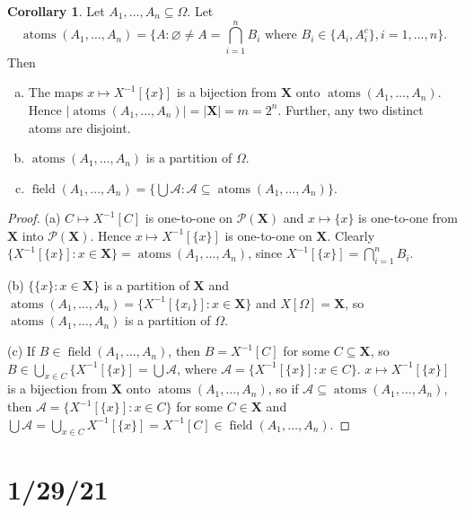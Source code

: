 \documentclass{article}
\DeclareMathOperator{\atoms}{atoms}
\theoremstyle{definition}
\newtheorem{corollary}[theorem]{Corollary}
\begin{document}
\begin{corollary}
    Let $A_1, \ldots, A_n \subseteq \Omega$. Let
    \[
        \atoms(A_1, \ldots, A_n) = \{A : \varnothing \neq A = \bigcap_{i=1}^n B_i \text{ where } B_i \in \{A_i, A_i^c\}, i = 1, \ldots, n \}.
    \]
    Then
    \begin{enumerate}[(a)]
        \item The maps $x \mapsto X^{-1}[\{x\}]$ is a bijection from $\mathbf{X}$ onto $\atoms(A_1, \ldots, A_n)$.
        Hence $|\atoms(A_1, \ldots, A_n)| = |\mathbf{X}| = m = 2^n$.
        Further, any two distinct atoms are disjoint.
        \item $\atoms(A_1, \ldots, A_n)$ is a partition of $\Omega$.
        \item $\operatorname{field}(A_1, \ldots, A_n) = \{\bigcup \mathscr{A} : \mathscr{A} \subseteq \atoms(A_1, \ldots, A_n)\}$.
    \end{enumerate}
\end{corollary}
\begin{proof}
    (a) $C \mapsto X^{-1}[C]$ is one-to-one on $\mathcal{P}(\mathbf{X})$ and $x\mapsto \{x\}$ is one-to-one from $\mathbf{X}$ into $\mathcal{P}(\mathbf{X})$.
    Hence $x \mapsto X^{-1}[\{x\}]$ is one-to-one on $\mathbf{X}$.
    Clearly $\{X^{-1}[\{x\}] : x \in \mathbf{X}\} = \atoms(A_1, \ldots, A_n)$, since $X^{-1}[\{x\}] = \bigcap_{i=1}^n B_i$.
    
    (b) $\{\{x\} : x \in \mathbf{X}\}$ is a partition of $\mathbf{X}$
    and $\atoms(A_1, \ldots, A_n) = \{X^{-1}[\{x_i\}] : x \in \mathbf{X}\}$
    and $X[\Omega] = \mathbf{X}$, so $\atoms(A_1, \ldots, A_n)$ is a partition of $\Omega$.
    
    (c) If $B \in \operatorname{field}(A_1, \ldots, A_n)$, then $B = X^{-1}[C]$ for some $C \subseteq \mathbf{X}$, so $B \in \bigcup_{x \in C} \{X^{-1}[\{x\}] = \bigcup \mathscr{A}$, where $\mathscr{A} = \{X^{-1}[\{x\}] : x \in C\}$.
    $x \mapsto X^{-1}[\{x\}]$ is a bijection from $\mathbf{X}$ onto $\atoms(A_1, \ldots, A_n)$, so if $\mathscr{A} \subseteq \atoms(A_1, \ldots, A_n)$, then $\mathscr{A} = \{X^{-1}[\{x\}] : x \in C\}$ for some $C \in \mathbf{X}$ and $\bigcup \mathscr{A} = \bigcup_{x \in C} X^{-1}[\{x\}] = X^{-1}[C] \in \operatorname{field}(A_1, \ldots, A_n)$.
\end{proof}

\section*{1/29/21}
\end{document}
